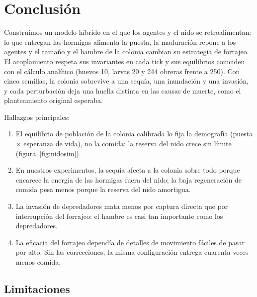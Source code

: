 \documentclass[11pt,a4paper]{article}
\begin{document}
\section{Conclusión}\label{sec:conclusion}

Construimos un modelo híbrido en el que los agentes y el nido se retroalimentan: lo que entregan las hormigas alimenta la puesta, la maduración repone a los agentes y el tamaño y el hambre de la colonia cambian su estrategia de forrajeo. El acoplamiento respeta sus invariantes en cada tick y sus equilibrios coinciden con el cálculo analítico (huevos 10, larvas 20 y 244 obreras frente a 250). Con cinco semillas, la colonia sobrevive a una sequía, una inundación y una invasión, y cada perturbación deja una huella distinta en las causas de muerte, como el planteamiento original esperaba.

Hallazgos principales:
\begin{enumerate}
  \item El equilibrio de población de la colonia calibrada lo fija la demografía (puesta $\times$ esperanza de vida), no la comida: la reserva del nido crece sin límite (figura~\ref{fig:nidosim}).
  \item En nuestros experimentos, la sequía afecta a la colonia sobre todo porque encarece la energía de las hormigas fuera del nido; la baja regeneración de comida pesa menos porque la reserva del nido amortigua.
  \item La invasión de depredadores mata menos por captura directa que por interrupción del forrajeo: el hambre es casi tan importante como los depredadores.
  \item La eficacia del forrajeo dependía de detalles de movimiento fáciles de pasar por alto. Sin las correcciones, la misma configuración entrega cuarenta veces menos comida.
\end{enumerate}

\subsection{Limitaciones}
\end{document}
